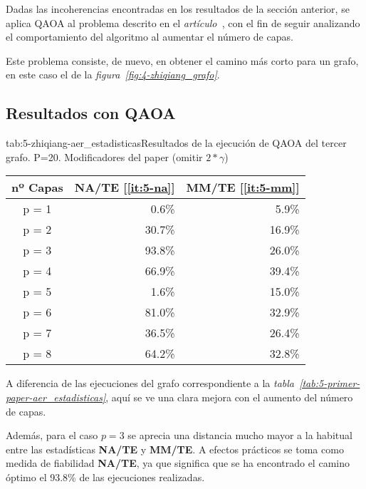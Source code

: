 Dadas las incoherencias encontradas en los resultados de la sección anterior, se aplica QAOA al problema descrito en el \textit{artículo~\cite{solving_shortest_path_with_qaoa}}, con el fin de seguir analizando el comportamiento del algoritmo al aumentar el número de capas.

Este problema consiste, de nuevo, en obtener el camino más corto para un grafo, en este caso el de la \textit{figura~\ref{fig:4-zhiqiang_grafo}}.

\subsection{Resultados con QAOA}

\begin{table}[htbp]{tab:5-zhiqiang-aer_estadisticas}{Resultados de la ejecución de QAOA del tercer grafo. P=20. Modificadores del paper (omitir \(2*\gamma\))}
  \centering
  \begin{tabular}{|c|r|r|}
    \hline
    \textbf{nº Capas} & \textbf{NA/TE} [\ref{it:5-na}] & \textbf{MM/TE} [\ref{it:5-mm}] \\ \hline
    p = 1 &  0.6\% &  5.9\% \\ \hline
    p = 2 & 30.7\% & 16.9\% \\ \hline
    p = 3 & 93.8\% & 26.0\% \\ \hline
    p = 4 & 66.9\% & 39.4\% \\ \hline  %
    p = 5 &  1.6\% & 15.0\% \\ \hline  %
    p = 6 & 81.0\% & 32.9\% \\ \hline
    p = 7 & 36.5\% & 26.4\% \\ \hline
    p = 8 & 64.2\% & 32.8\% \\ \hline
  \end{tabular}
\end{table}

A diferencia de las ejecuciones del grafo correspondiente a la \textit{tabla~\ref{tab:5-primer-paper-aer_estadisticas}}, aquí se ve una clara mejora con el aumento del número de capas.

Además, para el caso \(p = 3\) se aprecia una distancia mucho mayor a la habitual entre las estadísticas \textbf{NA/TE} y \textbf{MM/TE}. A efectos prácticos se toma como medida de fiabilidad \textbf{NA/TE}, ya que significa que se ha encontrado el camino óptimo el 93.8\% de las ejecuciones realizadas.

